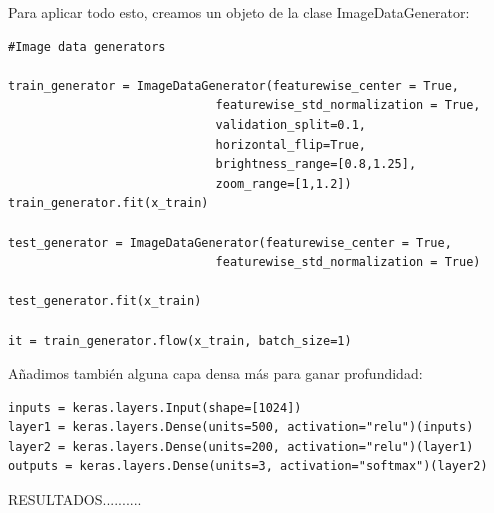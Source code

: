 \documentclass[11pt,a4paper]{article}
\theoremstyle{definition}
\begin{document}
Para aplicar todo esto, creamos un objeto de la clase ImageDataGenerator:

\begin{lstlisting}
#Image data generators

train_generator = ImageDataGenerator(featurewise_center = True,
                             featurewise_std_normalization = True,
                             validation_split=0.1,
                             horizontal_flip=True,
                             brightness_range=[0.8,1.25],
                             zoom_range=[1,1.2])
train_generator.fit(x_train)

test_generator = ImageDataGenerator(featurewise_center = True,
                             featurewise_std_normalization = True)

test_generator.fit(x_train)

it = train_generator.flow(x_train, batch_size=1)
\end{lstlisting}

Añadimos también alguna capa densa más para ganar profundidad:

\begin{lstlisting}
inputs = keras.layers.Input(shape=[1024])
layer1 = keras.layers.Dense(units=500, activation="relu")(inputs)
layer2 = keras.layers.Dense(units=200, activation="relu")(layer1)
outputs = keras.layers.Dense(units=3, activation="softmax")(layer2)
\end{lstlisting}


RESULTADOS..........
\end{document}
